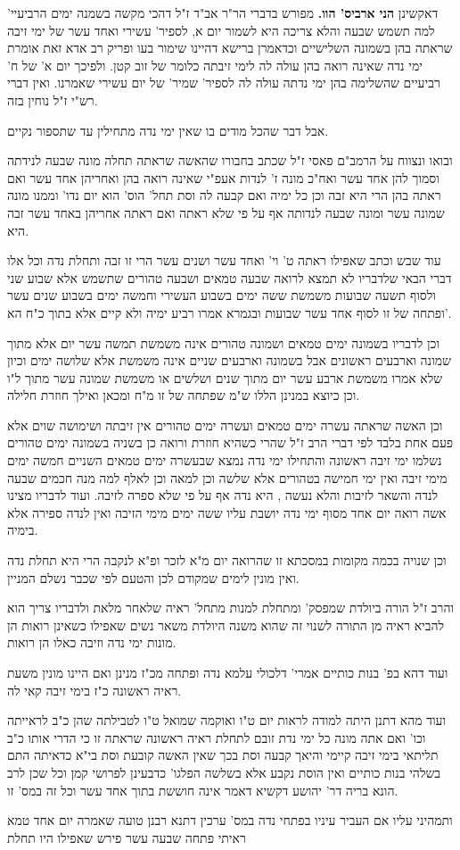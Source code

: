\documentclass[12pt, openany]{book}
\begin{document}
{ דאקשינן \textbf{הני ארביס' הוו.}  מפורש בדברי הר"ר אב"ד ז"ל דהכי מקשה בשמנה ימים הרביעיי' למה תשמש שבעה והלא צריכה היא לשמור יום א, לספיר' עשירי ואחד עשר של ימי זיבה שראתה בהן בשמונה השלישיים וכדאמרן ברישא דהיינו שימור בעו ופריק רב אדא זאת אומרת ימי נדה שאינה רואה בהן עולה לה לימי זיבתה כלומר של זוב קטן. ולפיכך יום א' של ח' רביעיים שהשלימה בהן ימי נדתה עולה לה לספיר' שמיר' של יום עשירי שאמרנו. ואין דברי רש"י ז"ל נוחין בזה.\par  אבל דבר שהכל מודים בו שאין ימי נדה מתחילין עד שתספור נקיים.\par  ובואו ונצווח על הרמב"ם פאסי ז"ל שכתב בחבורו שהאשה שראתה תחלה מונה שבעה לנידתה וסמוך להן אחד עשר ואח"כ מונה ז' לנדות אעפ"י שאינה רואה בהן ואחריהן אחד עשר ואם ראתה בהן הרי היא זבה וכן כל ימיה ואם קבעה לה וסת תחל' הוס' הוא יום נדו' וממנו מונה שמונה עשר ומונה שבעה לנדותה אף על פי שלא ראתה ואם ראתה אחריהן באחד עשר זבה היא.\par עוד שבש וכתב שאפילו ראתה ט' וי' ואחד עשר ושנים עשר הרי זו זבה ותחלת נדה וכל אלו דברי הבאי שלדבריו לא תמצא לרואה שבעה טמאים ושבעה טהורים שתשמש אלא שבוע שני ולסוף תשעה שבועות משמשת ששה ימים בשבוע העשירי וחמשה ימים בשבוע שנים עשר ופתחה של זו לסוף אחד עשר שבועות ובגמרא אמרו רביע ימיה ולא קיים אלא בתוך כ"ח הא'.\par  וכן לדבריו בשמונה ימים טמאים ושמונה טהורים אינה משמשת תמשה עשר יום אלא מתוך שמונה וארבעים ראשונים אבל בשמונה וארבעים שניים אינה משמשת אלא שלושה ימים וכיון שלא אמרו משמשת ארבע עשר יום מתוך שנים ושלשים או משמשת שמונה עשר מתוך ל"ו וכן כיוצא במנינן הללו ש"מ שפתחה של זו מ"ח ומכאן ואילך חוזרת חלילה.\par וכן האשה שראתה עשרה ימים טמאים ועשרה ימים טהורים אין זיבתה ושימושה שוים אלא פעם אחת בלבד לפי דברי הרב ז"ל שהרי כשהיא חוזרת ורואה כן בשניה בשמונה ימים טהורים נשלמו ימי זיבה ראשונה והתחילו ימי נדה נמצא שבעשרה ימים טמאים השניים חמשה ימים מימי זיבה ואין ימי חמישה בטהורים אלא שלשה וכן למאה וכן לאלף למה מנה חכמים שבעה לנדה והשאר לזיבות והלא נעשה , היא נדה אף על פי שלא ספרה לזיבה. ועוד לדבריו מצינו אשה רואה יום אחד מסוף ימי נדה יושבת עליו ששה ימים מימי הזיבה ואין לנדה ספירה אלא בימיה.\par וכן שנויה בכמה מקומות במסכתא זו שהרואה יום מ"א לזכר ופ"א לנקבה הרי היא תחלת נדה ואין מונין לימים שמקודם לכן והטעם לפי שכבר נשלם המניין.\par והרב ז"ל הורה ביולדת שמפסק' ומתחלת למנות מתחל' ראיה שלאחר מלאת ולדבריו צריך הוא להביא ראיה מן התורה לשנוי זה שהוא משנה היולדת משאר נשים שאפילו כשאינן רואות הן מונות ימי נדה וזיבה כאלו הן רואות.\par ועוד דהא בפ' בנות כותיים אמרי' דלכולי עלמא נדה ופתחה מכ"ז מנינן ואם היינו מונין משעת ראיה ראשונה כ"ז בימי זיבה קאי לה.\par  ועוד מהא דתנן היתה למודה לראות יום ט"ו ואוקמה שמואל ט"ו לטבילתה שהן כ"ב לראייתה וכו' ואם אתה מונה כל ימי נדת זובם לתחלת ראיה ראשונה שראתה זו כי הדרי אותו כ"ב תליתאי בימי זיבה קיימי והיאך קבעה וסת בכך שאין האשה קובעת וסת בי"א כדאיתה התם בשלהי בנות כותיים ואין הוסת נקבע אלא בשלשה הפלגו' כדבעינן לפרושי קמן וכל שכן לרב הונא בריה דר' יהושע דקשיא דאמר אינה חוששת בתוך אחד עשר וכל זה במס' זו.\par ותמהיני עליו אם העביר עיניו בפתחי נדה במס' ערכין דתנא רבנן טועה שאמרה יום אחד טמא ראיתי פתחה שבעה עשר פירש שאפילו היו תחלת }
\end{document}
